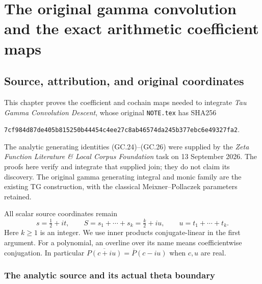 \begingroup

\section{The original gamma convolution and the exact arithmetic coefficient maps}



\subsection{Source, attribution, and original coordinates}

This chapter proves the coefficient and cochain maps needed to integrate
\emph{Tau Gamma Convolution Descent}, whose original
\texttt{NOTE.tex} has SHA256
\begin{center}\footnotesize
\texttt{7cf984d87de405b815250b44454c4ee27c8ab46574da245b377ebc6e49327fa2}.
\end{center}
The analytic generating identities (GC.24)--(GC.26) were supplied by
the \emph{Zeta Function Literature \& Local Corpus Foundation} task on
13 September 2026. The proofs here verify and integrate that supplied
join; they do not claim its discovery. The original gamma generating
integral and monic family are the existing TG construction, with the
classical Meixner--Pollaczek parameters retained.

All scalar source coordinates remain
\[
 s=\tfrac12+it,\qquad S=s_1+\cdots+s_k=\tfrac k2+iu,
 \qquad u=t_1+\cdots+t_k.                                      \tag{GC.1}
\]
Here $k\ge1$ is an integer. We use inner products conjugate-linear in
the first argument. For a polynomial, an overline over its name means
coefficientwise conjugation. In particular
$\overline{P(c+iu)}=\overline P(c-iu)$ when $c,u$ are real.

\subsubsection{The analytic source and its actual theta boundary}

